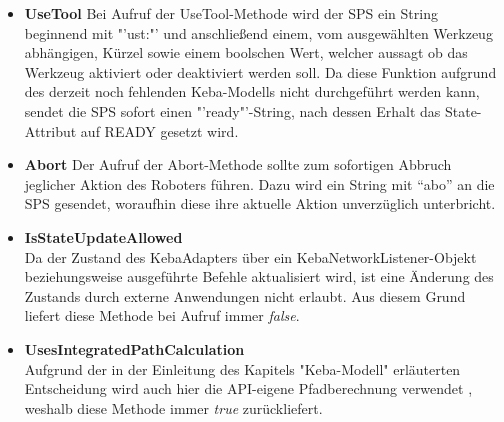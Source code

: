 \begin{itemize}
\item \textbf{UseTool}
\newline
Bei Aufruf der UseTool-Methode wird der SPS ein String beginnend mit "'ust:"' und anschließend einem, vom ausgewählten Werkzeug abhängigen, Kürzel sowie einem boolschen Wert, welcher aussagt ob das Werkzeug aktiviert oder deaktiviert werden soll. Da diese Funktion aufgrund des derzeit noch fehlenden Keba-Modells nicht durchgeführt werden kann, sendet die SPS sofort einen "'ready"'-String, nach dessen Erhalt das State-Attribut auf READY gesetzt wird. 
\item \textbf{Abort}
\newline
Der Aufruf der Abort-Methode sollte zum sofortigen Abbruch jeglicher Aktion des Roboters führen. Dazu wird ein String mit “abo” an die SPS gesendet, woraufhin diese ihre aktuelle Aktion unverzüglich unterbricht. 
\item \textbf{IsStateUpdateAllowed}\\
Da der Zustand des KebaAdapters über ein KebaNetworkListener-Objekt beziehungsweise ausgeführte Befehle aktualisiert wird, ist eine Änderung des Zustands durch externe Anwendungen nicht erlaubt. Aus diesem Grund liefert diese Methode bei Aufruf immer \textit{false}.
\item \textbf{UsesIntegratedPathCalculation}\\
Aufgrund der in der Einleitung des Kapitels "Keba-Modell" erläuterten Entscheidung wird auch hier die API-eigene Pfadberechnung verwendet , weshalb diese Methode immer \textit{true} zurückliefert.
\end{itemize}